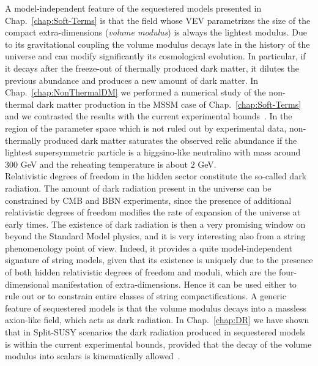 \documentclass[12pt,a4paper]{book}
\begin{document}
A model-independent feature of the sequestered models presented in Chap.~\ref{chap:Soft-Terms} is that the field whose VEV parametrizes the size of the compact extra-dimensions (\textit{volume modulus}) is always the lightest modulus. Due to its gravitational coupling the volume modulus decays late in the history of the universe and can modify significantly its cosmological evolution. In particular, if it decays after the freeze-out of thermally produced dark matter, it dilutes the previous abundance and produces a new amount of dark matter. In Chap.~\ref{chap:NonThermalDM} we performed a numerical study of the non-thermal dark matter production in the MSSM case of Chap.~\ref{chap:Soft-Terms} and we contrasted the results with the current experimental bounds~\cite{Aparicio:2015sda}. In the region of the parameter space which is not ruled out by experimental data, non-thermally produced dark matter saturates the observed relic abundance if the lightest supersymmetric particle is a higgsino-like neutralino with mass around $300$ GeV and the reheating temperature is about $2$ GeV.\\

Relativistic degrees of freedom in the hidden sector constitute the so-called dark radiation. The amount of dark radiation present in the universe can be constrained by CMB and BBN experiments, since the presence of additional relativistic degrees of freedom modifies the rate of expansion of the universe at early times. The existence of dark radiation is then a very promising window on beyond the Standard Model physics, and it is very interesting also from a string phenomenology point of view. Indeed, it provides a quite model-independent signature of string models, given that its existence is uniquely due to the presence of both hidden relativistic degrees of freedom and moduli, which are the four-dimensional manifestation of extra-dimensions. Hence it can be used either to rule out or to constrain entire classes of string compactifications. A generic feature of sequestered models is that the volume modulus decays into a massless axion-like field, which acts as dark radiation. In Chap.~\ref{chap:DR} we have shown that in Split-SUSY scenarios the dark radiation produced in sequestered models is within the current experimental bounds, provided that the decay of the volume modulus into scalars is kinematically allowed~\cite{Cicoli:2015bpq}.\\
\end{document}
